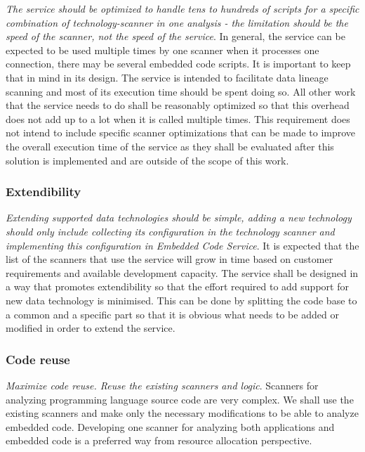 \textit{The service should be optimized to handle tens to hundreds of scripts for a specific combination of technology-scanner in one analysis - the limitation should be the speed of the scanner, not the speed of the service}. In general, the service can be expected to be used multiple times by one scanner when it processes one connection, there may be several embedded code scripts. It is important to keep that in mind in its design. The service is intended to facilitate data lineage scanning and most of its execution time should be spent doing so. All other work that the service needs to do shall be reasonably optimized so that this overhead does not add up to a lot when it is called multiple times. This requirement does not intend to include specific scanner optimizations that can be made to improve the overall execution time of the service as they shall be evaluated after this solution is implemented and are outside of the scope of this work.

\subsubsection{Extendibility}

\textit{Extending supported data technologies should be simple, adding a new technology should only include collecting its configuration in the technology scanner and implementing this configuration in Embedded Code Service}. It is expected that the list of the scanners that use the service will grow in time based on customer requirements and available development capacity. The service shall be designed in a way that promotes extendibility so that the effort required to add support for new data technology is minimised. This can be done by splitting the code base to a common and a specific part so that it is obvious what needs to be added or modified in order to extend the service.

\subsubsection{Code reuse}

\textit{Maximize code reuse. Reuse the existing scanners and logic}. Scanners for analyzing programming language source code are very complex. We shall use the existing scanners and make only the necessary modifications to be able to analyze embedded code. Developing one scanner for analyzing both applications and embedded code is a preferred way from resource allocation perspective.

